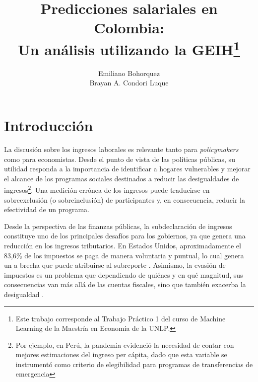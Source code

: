 \documentclass[11pt,oneside]{article}
\begin{document}
	
	
\title{Predicciones salariales en Colombia: \\
Un análisis utilizando la GEIH\thanks{Este trabajo corresponde al Trabajo Práctico 1 del curso de Machine Learning de la Maestría en Economía de la UNLP.}}

\vspace{2cm}

\author{
    Emiliano Bohorquez 

    Brayan A. Condori Luque}
	
\maketitle
	
\newpage

	\section{Introducción}

	La discusión sobre los ingresos laborales es relevante tanto para \textit{policymakers} como para economistas. Desde el punto de vista de las políticas públicas, su utilidad responda a la importancia de identificar a hogares vulnerables y mejorar el alcance de los programas sociales destinados a reducir las desigualdades de ingresos\footnote{Por ejemplo, en Perú, la pandemia evidenció la necesidad de contar con mejores estimaciones del ingreso per cápita, dado que esta variable se instrumentó como criterio de elegibilidad para programas de transferencias de emergencia}. Una medición errónea de los ingresos puede traducirse en sobreexclusión (o sobreinclusión) de participantes y, en consecuencia, reducir la efectividad de un programa. 

	Desde la perspectiva de las finanzas públicas, la subdeclaración de ingresos constituye uno de los principales desafíos para los gobiernos, ya que genera una reducción en los ingresos tributarios. En Estados Unidos, aproximadamente el 83,6\% de los impuestos se paga de manera voluntaria y puntual, lo cual genera un a brecha que puede atribuirse al subreporte \citep{tax}. Asimismo, la evasión de impuestos es un problema que dependiendo de quiénes y en qué magnitud, sus consecuencias van más allá de las cuentas fiscales, sino que también exacerba la desigualdad \citep{alstadsaeter2019tax}.
	
\end{document}
